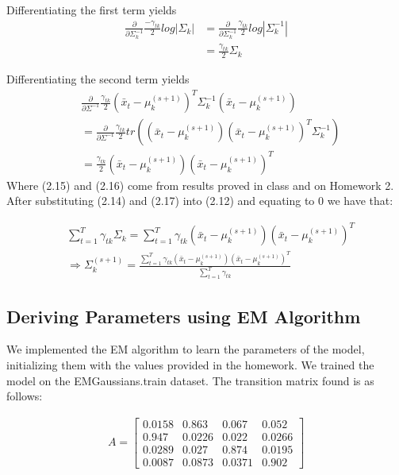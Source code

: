 \documentclass[paper=a4, fontsize=11pt]{scrartcl} %
\numberwithin{equation}{section} %
\numberwithin{figure}{section} %
\numberwithin{table}{section} %
\begin{document}
Differentiating the first term yields
\begin{align}
\frac{\partial}{\partial \Sigma^{-1}_{k}}\frac{-\gamma_{tk}}{2}log|\Sigma_k|
&=\frac{\partial}{\partial \Sigma^{-1}_{k}}\frac{\gamma_{tk}}{2}log|\Sigma^{-1}_k|\\
&=\frac{\gamma_{tk}}{2}\Sigma_k
\end{align}

Differentiating the second term yields
\begin{align}
&\frac{\partial}{\partial \Sigma^{-1}}\frac{\gamma_{tk}}{2}\left(\bar{x}_t-\mu_k^{(s+1)}\right)^T\Sigma_k^{-1}\left(\bar{x}_t-\mu_k^{(s+1)}\right)\\
&=\frac{\partial}{\partial \Sigma^{-1}}\frac{\gamma_{tk}}{2}tr\left(\left(\bar{x}_t-\mu_k^{(s+1)}\right)\left(\bar{x}_t-\mu_k^{(s+1)}\right)^T\Sigma_k^{-1}\right)\\
&= \frac{\gamma_{tk}}{2}\left(\bar{x}_t-\mu_k^{(s+1)}\right)\left(\bar{x}_t-\mu_k^{(s+1)}\right)^T
\end{align}
Where (2.15) and (2.16) come from results proved in class and on Homework 2. After substituting (2.14) and (2.17) into (2.12) and equating to 0 we have that:

\begin{align}
&\sum_{t=1}^{T}\gamma_{tk}\Sigma_k=\sum_{t=1}^{T}
\gamma_{tk}\left(\bar{x}_t-\mu_k^{(s+1)}\right)\left(\bar{x}_t-\mu_k^{(s+1)}\right)^T\\
&\Rightarrow \Sigma_k^{(s+1)} = \frac{\sum_{t=1}^{T}\gamma_{tk}(\bar{x}_t-\mu_k^{(s+1)})(\bar{x}_t-\mu_k^{(s+1)})^T}{\sum_{t=1}^{T}\gamma_{tk}}
\end{align}

\subsection{Deriving Parameters using EM Algorithm}
We implemented the EM algorithm to learn the parameters of the model, initializing them with the values provided in the homework. We trained the model on the EMGaussians.train dataset. The transition matrix found is as follows:

\begin{align*}
	 A = \begin{bmatrix}
	 0.0158 & 0.863 & 0.067 & 0.052\\
	 0.947 & 0.0226 & 0.022 & 0.0266\\ 
	 0.0289 & 0.027 & 0.874 & 0.0195 \\
	 0.0087 & 0.0873 & 0.0371 & 0.902\end{bmatrix}
\end{align*}
\end{document}
